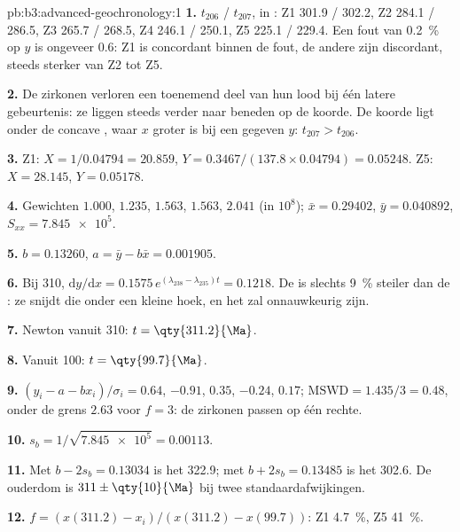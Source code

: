 \begin{solution}{pb:b3:advanced-geochronology:1}
\textbf{1.} $t_{206}$ / $t_{207}$, in \unit{\Ma}: Z1 301.9 / 302.2, Z2 284.1 /
286.5, Z3 265.7 / 268.5, Z4 246.1 / 250.1, Z5 225.1 / 229.4. Een fout van
\qty{0.2}{\percent} op $y$ is ongeveer \qty{0.6}{\Ma}: Z1 is concordant binnen
de fout, de andere zijn discordant, steeds sterker van Z2 tot Z5.

\textbf{2.} De zirkonen verloren een toenemend deel van hun lood bij één latere
gebeurtenis: ze liggen steeds verder naar beneden op de koorde. De koorde ligt onder de
concave , waar $x$ groter is bij een gegeven $y$: $t_{207} > t_{206}$.

\textbf{3.} Z1: $X = 1/0.04794 = 20.859$, $Y = 0.3467/(137.8\times0.04794) =
0.05248$. Z5: $X = 28.145$, $Y = 0.05178$.

\textbf{4.} Gewichten $1.000$, $1.235$, $1.563$, $1.563$, $2.041$ (in
$10^8$); $\bar x = 0.29402$, $\bar y = 0.040892$, $S_{xx} = \num{7.845e5}$.

\textbf{5.} $b = 0.13260$, $a = \bar y - b\bar x = 0.001905$.

\textbf{6.} Bij \qty{310}{\Ma}, $\mathrm dy/\mathrm dx = 0.1575\,
e^{(\lambda_{238} - \lambda_{235})t} = 0.1218$. De  is slechts
\qty{9}{\percent} steiler dan de : ze snijdt die onder een kleine hoek,
en het  zal onnauwkeurig zijn.

\textbf{7.} Newton vanuit \qty{310}{\Ma}: $t = \qty{311.2}{\Ma}$.

\textbf{8.} Vanuit \qty{100}{\Ma}: $t = \qty{99.7}{\Ma}$.

\textbf{9.} $(y_i - a - bx_i)/\sigma_i = 0.64$, $-0.91$, $0.35$, $-0.24$,
$0.17$; $\mathrm{MSWD} = 1.435/3 = 0.48$, onder de grens $2.63$ voor $f = 3$:
de zirkonen passen op één rechte.

\textbf{10.} $s_b = 1/\sqrt{\num{7.845e5}} = 0.00113$.

\textbf{11.} Met $b - 2s_b = 0.13034$ is het 
\qty{322.9}{\Ma}; met $b + 2s_b = 0.13485$ is het \qty{302.6}{\Ma}. De ouderdom is
$311 \pm \qty{10}{\Ma}$ bij twee standaardafwijkingen.

\textbf{12.} $f = (x(311.2) - x_i)/(x(311.2) - x(99.7))$: Z1 \qty{4.7}{\percent},
Z5 \qty{41}{\percent}.


\end{solution}
